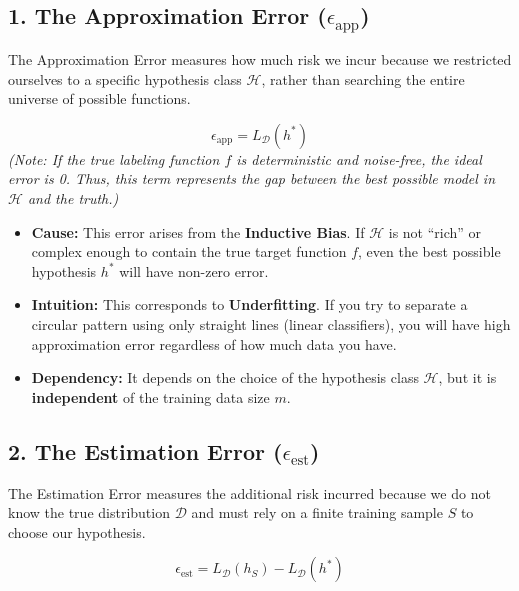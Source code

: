 \documentclass[
  italian,
  11pt,
]{article}
\providecommand{\tightlist}{%
  \setlength{\itemsep}{0pt}\setlength{\parskip}{0pt}}
\begin{document}
\subsection{\texorpdfstring{1. The Approximation Error
(\(\epsilon_{\text{app}}\))}{1. The Approximation Error (\textbackslash epsilon\_\{\textbackslash text\{app\}\})}}\label{the-approximation-error-epsilon_textapp}

The Approximation Error measures how much risk we incur because we
restricted ourselves to a specific hypothesis class \(\mathcal{H}\),
rather than searching the entire universe of possible functions.

\[ \epsilon_{\text{app}} = L_{\mathcal{D}}(h^*) \] \emph{(Note: If the
true labeling function \(f\) is deterministic and noise-free, the ideal
error is 0. Thus, this term represents the gap between the best possible
model in \(\mathcal{H}\) and the truth.)}

\begin{itemize}
\tightlist
\item
  \textbf{Cause:} This error arises from the \textbf{Inductive Bias}. If
  \(\mathcal{H}\) is not ``rich'' or complex enough to contain the true
  target function \(f\), even the best possible hypothesis \(h^*\) will
  have non-zero error.
\item
  \textbf{Intuition:} This corresponds to \textbf{Underfitting}. If you
  try to separate a circular pattern using only straight lines (linear
  classifiers), you will have high approximation error regardless of how
  much data you have.
\item
  \textbf{Dependency:} It depends on the choice of the hypothesis class
  \(\mathcal{H}\), but it is \textbf{independent} of the training data
  size \(m\).
\end{itemize}

\subsection{\texorpdfstring{2. The Estimation Error
(\(\epsilon_{\text{est}}\))}{2. The Estimation Error (\textbackslash epsilon\_\{\textbackslash text\{est\}\})}}\label{the-estimation-error-epsilon_textest}

The Estimation Error measures the additional risk incurred because we do
not know the true distribution \(\mathcal{D}\) and must rely on a finite
training sample \(S\) to choose our hypothesis.

\[ \epsilon_{\text{est}} = L_{\mathcal{D}}(h_S) - L_{\mathcal{D}}(h^*) \]
\end{document}
